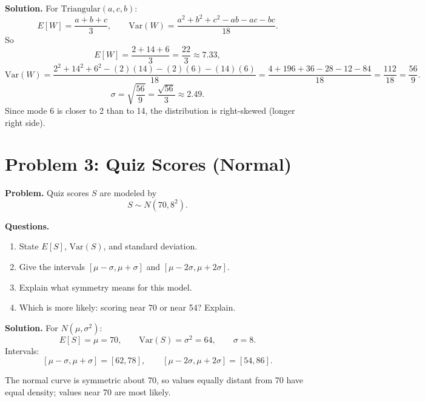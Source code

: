 \textbf{Solution.}
For \(\text{Triangular}(a,c,b)\):
\[
E[W]=\frac{a+b+c}{3},\qquad
\mathrm{Var}(W)=\frac{a^2+b^2+c^2-ab-ac-bc}{18}.
\]
So
\[
E[W]=\frac{2+14+6}{3}=\frac{22}{3}\approx 7.33,
\]
\[
\mathrm{Var}(W)=\frac{2^2+14^2+6^2-(2)(14)-(2)(6)-(14)(6)}{18}
=\frac{4+196+36-28-12-84}{18}=\frac{112}{18}=\frac{56}{9}.
\]
\[
\sigma=\sqrt{\frac{56}{9}}=\frac{\sqrt{56}}{3}\approx 2.49.
\]
Since mode 6 is closer to 2 than to 14, the distribution is right-skewed (longer right side).

\section{Problem 3: Quiz Scores (Normal)}

\textbf{Problem.}
Quiz scores \(S\) are modeled by
\[
S\sim N(70,8^2).
\]

\textbf{Questions.}
\begin{enumerate}
  \item State \(E[S]\), \(\mathrm{Var}(S)\), and standard deviation.
  \item Give the intervals \([\mu-\sigma,\mu+\sigma]\) and \([\mu-2\sigma,\mu+2\sigma]\).
  \item Explain what symmetry means for this model.
  \item Which is more likely: scoring near 70 or near 54? Explain.
\end{enumerate}

\textbf{Solution.}
For \(N(\mu,\sigma^2)\):
\[
E[S]=\mu=70,\qquad \mathrm{Var}(S)=\sigma^2=64,\qquad \sigma=8.
\]
Intervals:
\[
[\mu-\sigma,\mu+\sigma]=[62,78],\qquad [\mu-2\sigma,\mu+2\sigma]=[54,86].
\]
\begin{center}
\end{center}
The normal curve is symmetric about 70, so values equally distant from 70 have equal density; values near 70 are most likely.

